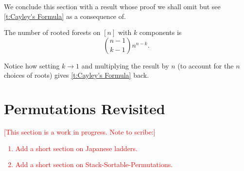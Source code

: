 We conclude this section with a result whose proof we shall omit but see \cref{t:Cayley's Formula} as a consequence of. 
\begin{theorem}
    The number of rooted forests on $[n]$ with $k$ components is \[
    \binom{n-1}{k-1}n^{n-k}.
    \]
\end{theorem}
Notice how setting $k\to 1$ and multiplying the result by $n$ (to account for the $n$ choices of roots) gives \cref{t:Cayley's Formula} back. 
\section{Permutations Revisited}
\textcolor{red}{[This section is a work in progress. Note to scribe:]
\begin{enumerate}
    \item Add a short section on Japanese ladders.
    \item Add a short section on Stack-Sortable-Permutations.
\end{enumerate}
}







\endinput
